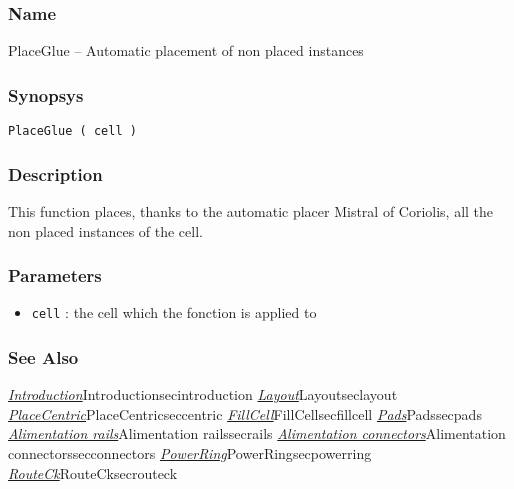 \subsubsection{Name}

PlaceGlue -- Automatic placement of non placed instances

\subsubsection{Synopsys}

\begin{verbatim}
PlaceGlue ( cell )
\end{verbatim}

\subsubsection{Description}

This function places, thanks to the automatic placer Mistral of Coriolis, all the non placed instances of the cell.
    
\subsubsection{Parameters}

\begin{itemize}
    \item \verb-cell- : the cell which the fonction is applied to
\end{itemize}
    
%
%
\subsubsection{See Also}

\hyperref[ref]{\emph{Introduction}}{}{Introduction}{secintroduction}
\hyperref[ref]{\emph{Layout}}{}{Layout}{seclayout}
\hyperref[ref]{\emph{PlaceCentric}}{}{PlaceCentric}{seccentric}
\hyperref[ref]{\emph{FillCell}}{}{FillCell}{secfillcell}
\hyperref[ref]{\emph{Pads}}{}{Pads}{secpads}
\hyperref[ref]{\emph{Alimentation rails}}{}{Alimentation rails}{secrails}
\hyperref[ref]{\emph{Alimentation connectors}}{}{Alimentation connectors}{secconnectors}
\hyperref[ref]{\emph{PowerRing}}{}{PowerRing}{secpowerring}
\hyperref[ref]{\emph{RouteCk}}{}{RouteCk}{secrouteck}
